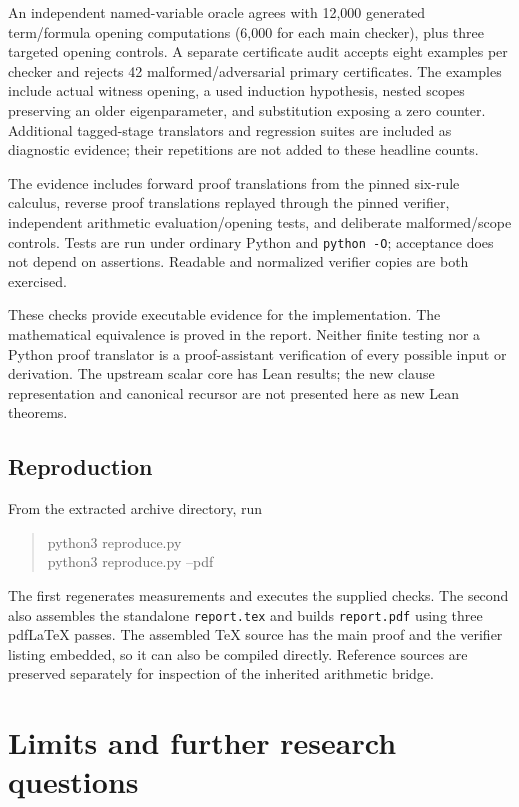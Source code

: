 \documentclass[11pt,letterpaper]{article}
\theoremstyle{definition}\newtheorem{definition}[theorem]{Definition}
\newcommand{\file}[1]{\texttt{\small\nolinkurl{#1}}}
\begin{document}
An independent named-variable oracle agrees with 12,000 generated
term/formula opening computations (6,000 for each main checker), plus
three targeted opening controls. A separate certificate audit accepts
eight examples per checker and rejects 42 malformed/adversarial primary
certificates. The examples include actual witness opening, a used
induction hypothesis, nested scopes preserving an older eigenparameter,
and substitution exposing a zero counter. Additional tagged-stage
translators and regression suites are included as diagnostic evidence;
their repetitions are not added to these headline counts.


The evidence includes forward proof translations from the pinned six-rule calculus, reverse proof translations replayed through the pinned verifier, independent arithmetic evaluation/opening tests, and deliberate malformed/scope controls. Tests are run under ordinary Python and \file{python -O}; acceptance does not depend on assertions. Readable and normalized verifier copies are both exercised.

These checks provide executable evidence for the implementation. The mathematical equivalence is proved in the report. Neither finite testing nor a Python proof translator is a proof-assistant verification of every possible input or derivation. The upstream scalar core has Lean results; the new clause representation and canonical recursor are not presented here as new Lean theorems.

\subsection{Reproduction}
From the extracted archive directory, run
\begin{quote}\ttfamily
python3 reproduce.py\\
python3 reproduce.py --pdf
\end{quote}
The first regenerates measurements and executes the supplied checks. The second also assembles the standalone \file{report.tex} and builds \file{report.pdf} using three pdfLaTeX passes. The assembled TeX source has the main proof and the verifier listing embedded, so it can also be compiled directly. Reference sources are preserved separately for inspection of the inherited arithmetic bridge.

\section{Limits and further research questions}
\end{document}
